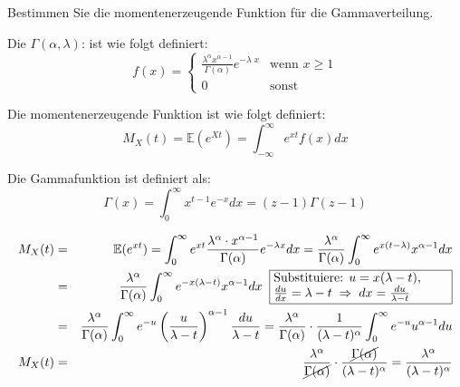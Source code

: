 \begin{uebsp}
\begin{Exercise}[label=ex:3.7]
Bestimmen Sie die momentenerzeugende Funktion für die Gammaverteilung.
\end{Exercise}
\begin{Answer}
\begin{uebsp_theory}
    Die  $\Gamma(\alpha, \lambda)$: ist wie folgt definiert:
        \[f(x) = \begin{cases}
                    \frac{\lambda^\alpha x^{\alpha-1}}{\Gamma(\alpha)}e^{-\lambda\; x} &\mbox{wenn } x \geq 1 \\
                    0 & \mbox{sonst}
            \end{cases}\]
\end{uebsp_theory}

\begin{uebsp_theory}
    Die momentenerzeugende Funktion ist wie folgt definiert:
        \[M_X(t)=\mathbb{E}(e^{Xt})=\int_{-\infty}^{\infty}e^{xt}f(x)dx\]
\end{uebsp_theory}

\begin{uebsp_theory}
Die Gammafunktion ist definiert als:
\[\Gamma(x)=\int_0^\infty x^{t-1}e^{-x}dx=(z-1)\Gamma(z-1)\]
\end{uebsp_theory}

\begin{eqnarray*}
M_X(t) &=& \mathbb{E}(e^{xt})=\int_0^\infty e^{xt}\frac{\lambda^\alpha\cdot x^{\alpha-1}}{\Gamma(\alpha)}e^{-\lambda x}dx=\frac{\lambda^\alpha}{\Gamma(\alpha)}\int_0^\infty e^{x(t-\lambda)}x^{\alpha-1}dx\\
 &=& \frac{\lambda^\alpha}{\Gamma(\alpha)}\int_0^\infty e^{-x(\lambda-t)}x^{\alpha-1}dx\;\;\fbox{\parbox[c][2em][c]{0.4\textwidth}{Substituiere: $u=x(\lambda-t)$, \\$\frac{du}{dx}=\lambda-t\;\Rightarrow\;dx=\frac{du}{\lambda-t}$}}\\
 &=& \frac{\lambda^\alpha}{\Gamma(\alpha)}\int_0^\infty e^{-u}\left(\frac{u}{\lambda-t}\right)^{\alpha-1}\frac{du}{\lambda-t} = \frac{\lambda^\alpha}{\Gamma(\alpha)}\cdot \frac{1}{(\lambda-t)^\alpha}\int_0^\infty e^{-u}u^{\alpha-1}du\\
M_{X}(t) &=& \frac{\lambda^\alpha}{\cancel{\Gamma(\alpha)}}\cdot \frac{\cancel{\Gamma(\alpha)}}{(\lambda-t)^\alpha}=\frac{\lambda^\alpha}{(\lambda-t)^\alpha}
\end{eqnarray*}

\end{Answer}
\end{uebsp}
